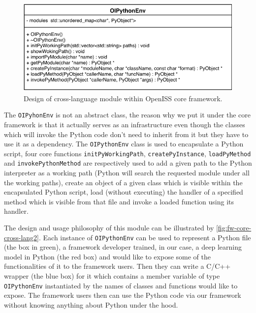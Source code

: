 \begin{figure}
    \centering
    \includegraphics[scale=0.8]{figures/framework_core_cross_lang.pdf}
    \caption{Design of cross-language module within OpenISS core framework.}
    \label{fig:fw-core-cross-lang}
\end{figure}

The \texttt{OIPyhonEnv} is not an abstract class,
the reason why we put it under the core framework is that it actually serves as
an infrastructure even though the classes which will invoke the Python code
don't need to inherit from it but they have to use it as a dependency.
The \texttt{OIPythonEnv} class is used to encapsulate a Python script, four
core functions \texttt{initPyWorkingPath}, \texttt{createPyInstance},
\texttt{loadPyMethod} and \texttt{invokePythonMethod} are respectively used to
add a given path to the Python interpreter as a working path (Python will search
the requested module under all the working paths), create an object of a given
class which is visible within the encapsulated Python script, load (without
executing) the handler of a specified method which is visible from that file and
invoke a loaded function using its handler.

The design and usage philosophy of this module can be illustrated by
\autoref{fig:fw-core-cross-lang2}. Each instance of \texttt{OIPythonEnv}
can be used to represent a Python file (the box in green), a framework
developer trained, in our case, a deep learning model in Python (the red box)
and would like to expose some of the functionalities of it to the framework
users. Then they can write a C/C++ wrapper (the blue box) for it which
contains a member variable of type \texttt{OIPythonEnv} instantiated by the
names of classes and functions would like to expose. The framework users then
can use the Python code via our framework without knowing anything about Python
under the hood.

